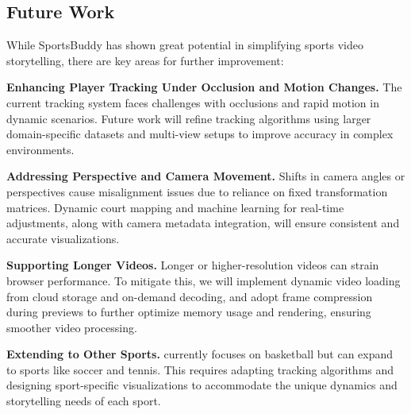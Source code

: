 {
\subsection{Future Work}

While SportsBuddy has shown great potential in simplifying sports video storytelling, 
there are key areas for further improvement:

\vspace{1mm}
\noindent\textbf{Enhancing Player Tracking Under Occlusion and Motion Changes.}
The current tracking system faces challenges with occlusions and rapid motion in dynamic scenarios. Future work will refine tracking algorithms using larger domain-specific datasets and multi-view setups to improve accuracy in complex environments.


\vspace{1mm}
\noindent\textbf{Addressing Perspective and Camera Movement.}
Shifts in camera angles or perspectives cause misalignment issues due to reliance on fixed transformation matrices. Dynamic court mapping and machine learning for real-time adjustments, along with camera metadata integration, will ensure consistent and accurate visualizations.


\vspace{1mm}
\noindent\textbf{Supporting Longer Videos.}
Longer or higher-resolution videos can strain browser performance. To mitigate this, we will implement dynamic video loading from cloud storage and on-demand decoding, and adopt frame compression during previews to further optimize memory usage and rendering, ensuring smoother video processing.



\vspace{1mm}
\noindent\textbf{Extending to Other Sports.}
\SB{} currently focuses on basketball but can expand to sports like soccer and tennis. This requires adapting tracking algorithms and designing sport-specific visualizations to accommodate the unique dynamics and storytelling needs of each sport.

}


